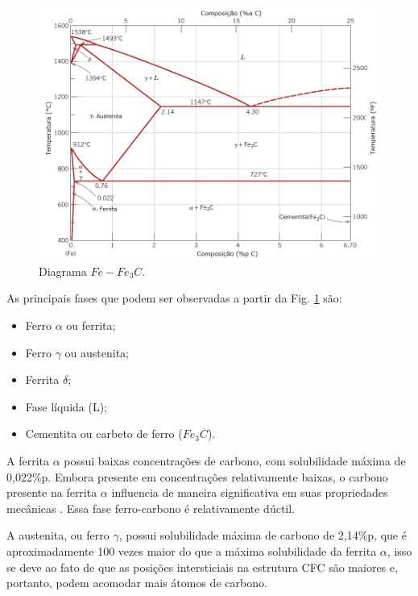 \documentclass[
12pt,
openany, %
oneside, %
a4paper,			
english,			
brazil			        %
]{abntbibufjf}
\begin{document}
	\begin{figure}[H]
		\centering
		\includegraphics[width=1\textwidth]{ferro_carbono}
		\caption{Diagrama $Fe-Fe_3C$. \cite{callister2011materials}}
		\label{fig:ferro_carbono}
	\end{figure}

	As principais fases que podem ser observadas a partir da Fig. \ref{fig:ferro_carbono} são:

	\begin{itemize}
		\item Ferro $\alpha$ ou ferrita;
		\item Ferro $\gamma$ ou austenita;
		\item Ferrita $\delta$;
		\item Fase líquida (L);
		\item Cementita ou carbeto de ferro ($Fe_3C$).
	\end{itemize}

	A ferrita $\alpha$ possui baixas concentrações de carbono, com solubilidade máxima de 0,022\%p. Embora presente em concentrações relativamente baixas, o carbono presente na ferrita $\alpha$ influencia de maneira significativa em suas propriedades mecânicas \cite{callister2011materials}. Essa fase ferro-carbono é relativamente dúctil.
	
	A austenita, ou ferro $\gamma$, possui solubilidade máxima de carbono de 2,14\%p, que é aproximadamente 100 vezes maior do que a máxima solubilidade da ferrita $\alpha$, isso se deve ao fato de que as posições intersticiais na estrutura CFC são maiores e, portanto, podem acomodar mais átomos de carbono.
	
\end{document}
